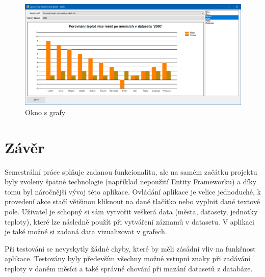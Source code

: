 \documentclass[12pt, a4paper]{article}
\begin{document}
\newpage
\begin{figure}[h!]
	\centering
	\includegraphics[width=15cm]{img/graph_window.png}
	\caption{Okno s grafy}
	\label{fig:graph_window}
\end{figure}

\newpage
\section{Závěr}
Semestrální práce splňuje zadanou funkcionalitu, ale na samém začátku projektu byly zvoleny špatné technologie (například nepoužití Entity Frameworku) a díky tomu byl náročnější vývoj této aplikace. Ovládání aplikace je velice jednoduché, k provedení akce stačí většinou kliknout na dané tlačítko nebo vyplnit dané textové pole. Uživatel je schopný si sám vytvořit veškerá data (města, datasety, jednotky teploty), které lze následně použít při vytváření záznamů v datasetu. V aplikaci je také možné si zadaná data vizualizovat v grafech.

Při testování se nevyskytly žádné chyby, které by měli zásádní vliv na funkčnost aplikace. Testovány byly především všechny možné vstupní znaky při zadávání teploty v daném měsíci a také správné chování při mazání datasetů z databáze.

\newpage
\setcounter{section}{0}
\renewcommand{\thesection}{\Alph{section}}
\end{document}
